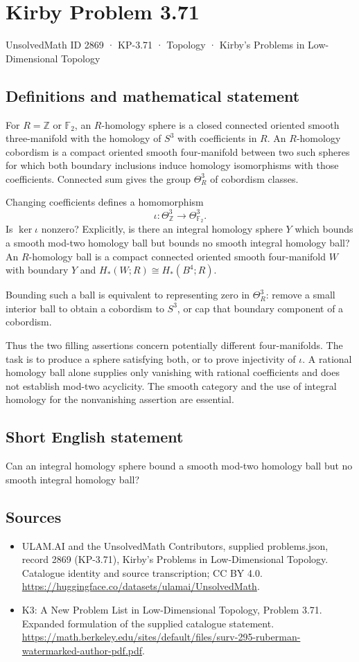 \documentclass[11pt,a4paper]{article}
\begin{document}
\section*{Kirby Problem 3.71}\label{2869}
{\small UnsolvedMath ID 2869 · KP-3.71 · Topology · Kirby's Problems in Low-Dimensional Topology}
\subsection{Definitions and mathematical statement}
For $R=\mathbb Z$ or $\mathbb F_2$, an $R$-homology sphere is a closed connected oriented smooth three-manifold with the homology of $S^3$ with coefficients in $R$. An $R$-homology cobordism is a compact oriented smooth four-manifold between two such spheres for which both boundary inclusions induce homology isomorphisms with those coefficients. Connected sum gives the group $\Theta^3_R$ of cobordism classes.

Changing coefficients defines a homomorphism
\[
\iota:\Theta^3_{\mathbb Z}\longrightarrow\Theta^3_{\mathbb F_2}.
\]
Is $\ker\iota$ nonzero? Explicitly, is there an integral homology sphere $Y$ which bounds a smooth mod-two homology ball but bounds no smooth integral homology ball? An $R$-homology ball is a compact connected oriented smooth four-manifold $W$ with boundary $Y$ and $H_*(W;R)\cong H_*(B^4;R)$.

Bounding such a ball is equivalent to representing zero in $\Theta^3_R$: remove a small interior ball to obtain a cobordism to $S^3$, or cap that boundary component of a cobordism.

Thus the two filling assertions concern potentially different four-manifolds. The task is to produce a sphere satisfying both, or to prove injectivity of $\iota$. A rational homology ball alone supplies only vanishing with rational coefficients and does not establish mod-two acyclicity. The smooth category and the use of integral homology for the nonvanishing assertion are essential.
\subsection{Short English statement}
Can an integral homology sphere bound a smooth mod-two homology ball but no smooth integral homology ball?
\subsection{Sources}
\begin{itemize}
\item[S1] ULAM.AI and the UnsolvedMath Contributors, supplied problems.json, record 2869 (KP-3.71), Kirby's Problems in Low-Dimensional Topology. Catalogue identity and source transcription; CC BY 4.0.
\url{https://huggingface.co/datasets/ulamai/UnsolvedMath}.
\item[S2] K3: A New Problem List in Low-Dimensional Topology, Problem 3.71. Expanded formulation of the supplied catalogue statement.
\url{https://math.berkeley.edu/sites/default/files/surv-295-ruberman-watermarked-author-pdf.pdf}.
\end{itemize}
\end{document}
